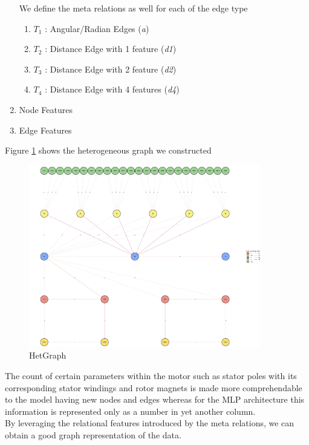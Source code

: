 \documentclass{report} %
\begin{document}
\begin{enumerate}
    We define the meta relations as well for each of the edge type \\
    \begin{enumerate}
        \item \( T_1\) : Angular/Radian Edges (\textit{a}) 
        \item \( T_2\) : Distance Edge with 1 feature (\textit{d1}) 
        \item \( T_3\) : Distance Edge with 2 feature (\textit{d2}) 
        \item \( T_4\) : Distance Edge with 4 features (\textit{d4})  
    \end{enumerate}
    \item Node Features 
    \item Edge Features 
\end{enumerate}

Figure \ref{fig:HetGraph} shows the heterogeneous graph we constructed
\begin{figure}[H]
    \centering
    \includegraphics[width=0.9\textwidth]{./ReportImages/graph.png} 
    \caption{HetGraph}
    \label{fig:HetGraph}
\end{figure}
The count of certain parameters within the motor such as stator poles with its corresponding stator windings and rotor magnets is made more comprehendable to the model having new nodes and edges whereas for the \ac{MLP} architecture this information is represented only as a number in yet another column. \\
By leveraging the relational features introduced by the meta relations, we can obtain a good graph representation of the data.\\
\end{document}
